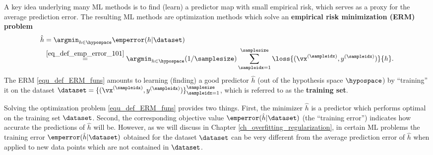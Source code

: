 \documentclass[12pt]{report}
\begin{document}
A key idea underlying many ML methods is to find (learn) a predictor map with small empirical risk, 
which serves as a proxy for the average prediction error. The resulting ML methods are optimization 
methods which solve an {\bf empirical risk minimization (ERM) problem} 
\begin{align}
\label{equ_def_ERM_funs}
   \hat{h} & = \argmin_{h \in \hypospace} \emperror(h|\dataset) \nonumber \\ 
   & \stackrel{\eqref{eq_def_emp_error_101}}{=}  \argmin_{h \in \hypospace} (1/\samplesize) \sum_{\sampleidx=1}^{\samplesize} \loss{(\vx^{(\sampleidx)},y^{(\sampleidx)})}{h}.
\end{align}
The ERM \eqref{equ_def_ERM_funs} amounts to learning (finding) a good predictor $\hat{h}$ (out of the hypothesis 
space $\hypospace$) by ``training'' it on the dataset $\dataset = \{ (\vx^{(\sampleidx)},y^{(\sampleidx)}) \}_{\sampleidx=1}^{\samplesize}$, 
which is referred to as the {\bf training set}. 

Solving the optimization problem \eqref{equ_def_ERM_funs} provides two things. First, the 
minimizer $\hat{h}$ is a predictor which performs optimal on the training set $\dataset$. Second, 
the corresponding objective value $\emperror(\hat{h}|\dataset)$ (the ``training error'') indicates 
how accurate the predictions of $\hat{h}$ will be. However, as we will discuss in Chapter \ref{ch_overfitting_regularization}, 
in certain ML problems the training error $\emperror(\hat{h}|\dataset)$ obtained for the 
dataset $\dataset$ can be very different from the average prediction error of $\hat{h}$ when applied 
to new data points which are not contained in $\dataset$. 
\end{document}

